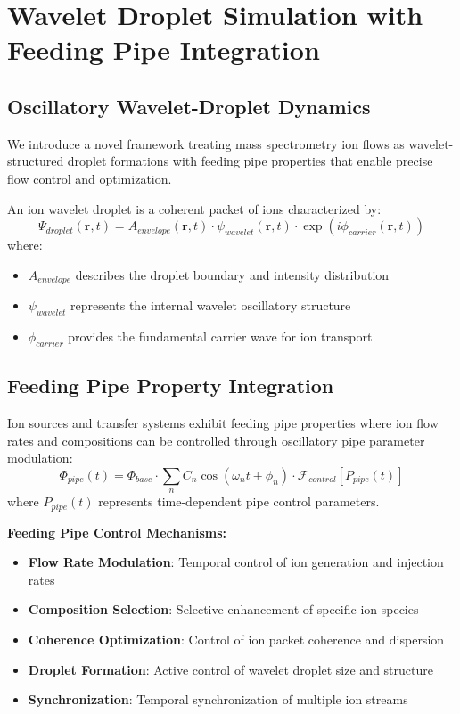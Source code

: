 \section{Wavelet Droplet Simulation with Feeding Pipe Integration}

\subsection{Oscillatory Wavelet-Droplet Dynamics}

We introduce a novel framework treating mass spectrometry ion flows as wavelet-structured droplet formations with feeding pipe properties that enable precise flow control and optimization.

\begin{definition}
An ion wavelet droplet is a coherent packet of ions characterized by:
$$\Psi_{droplet}(\mathbf{r}, t) = A_{envelope}(\mathbf{r}, t) \cdot \psi_{wavelet}(\mathbf{r}, t) \cdot \exp(i\phi_{carrier}(\mathbf{r}, t))$$
where:
\begin{itemize}
\item $A_{envelope}$ describes the droplet boundary and intensity distribution
\item $\psi_{wavelet}$ represents the internal wavelet oscillatory structure
\item $\phi_{carrier}$ provides the fundamental carrier wave for ion transport
\end{itemize}
\end{definition}

\subsection{Feeding Pipe Property Integration}

\begin{definition}
Ion sources and transfer systems exhibit feeding pipe properties where ion flow rates and compositions can be controlled through oscillatory pipe parameter modulation:
$$\Phi_{pipe}(t) = \Phi_{base} \cdot \sum_n C_n \cos(\omega_n t + \phi_n) \cdot \mathcal{F}_{control}[P_{pipe}(t)]$$
where $P_{pipe}(t)$ represents time-dependent pipe control parameters.
\end{definition}

\textbf{Feeding Pipe Control Mechanisms:}
\begin{itemize}
\item \textbf{Flow Rate Modulation}: Temporal control of ion generation and injection rates
\item \textbf{Composition Selection}: Selective enhancement of specific ion species
\item \textbf{Coherence Optimization}: Control of ion packet coherence and dispersion
\item \textbf{Droplet Formation}: Active control of wavelet droplet size and structure
\item \textbf{Synchronization}: Temporal synchronization of multiple ion streams
\end{itemize}

